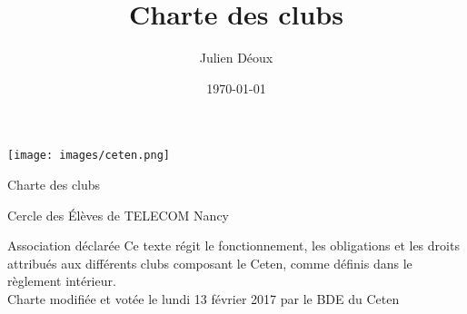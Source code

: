 \documentclass{article}
\title{Charte des clubs}
\author{Julien Déoux}
\date\today
\begin{document}
	
	\begin{titlepage}
		\begin{center}
			\texttt{[image: images/ceten.png]}\par
			\vspace{3cm}
			{\Huge \light{} Charte des clubs}\par
			\vfill
			{\large Cercle des Élèves de TELECOM Nancy}\par
			{\large\light{} Association déclarée}
			\vfill
			{\light{} Ce texte régit le fonctionnement, les obligations et les
			droits attribués aux différents clubs composant le Ceten, comme
			définis dans le règlement intérieur.\\
			Charte modifiée et votée le lundi 13 février 2017 par le BDE du
			Ceten}
		\end{center}
	\end{titlepage}


\end{document}
